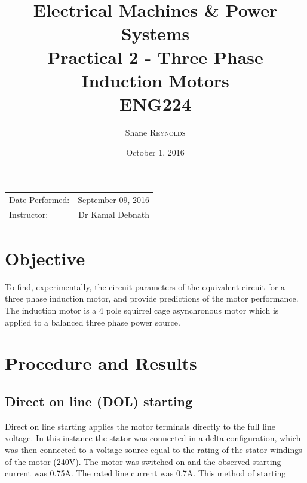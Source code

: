 \documentclass{article}
\title{Electrical Machines \& Power Systems \\ Practical 2 - Three Phase Induction Motors \\ ENG224} %
\author{Shane \textsc{Reynolds}} %
\date{October 1, 2016} %
\begin{document}
\maketitle %

\begin{center}
\begin{tabular}{l r}
Date Performed: & September 09, 2016 \\ %
Instructor: & Dr Kamal Debnath %
\end{tabular}
\end{center}



\section{Objective}

To find, experimentally, the circuit parameters of the equivalent circuit for a three phase induction motor, and provide predictions of the motor performance. The induction motor is a 4 pole squirrel cage asynchronous motor which is applied to a balanced three phase power source. 
 

\section{Procedure and Results}
\subsection{Direct on line (DOL) starting}
Direct on line starting applies the motor terminals directly to the full line voltage. In this instance the stator was connected in a delta configuration, which was then connected to a voltage source equal to the rating of the stator windings of the motor (240$\si{\volt}$). The motor was switched on and the observed starting current was 0.75$\si{\ampere}$. The rated line current was 0.7$\si{\ampere}$. This method of starting 
\end{document}

